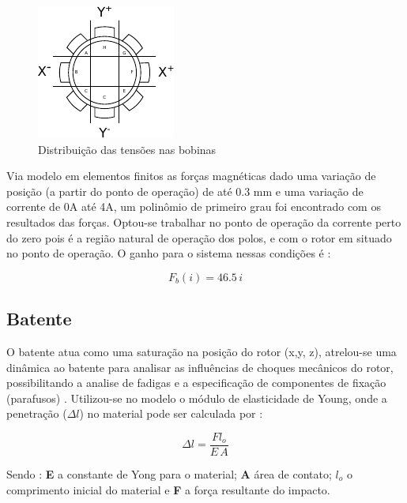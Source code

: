 \begin{figure}[th]
\centering
\includegraphics[width=0.5\linewidth]{./Figs/Modelagem/ativo-atuadores-conexao}
%
\caption{Distribuição das tensões nas bobinas}
\label{fig:blocos:tensao:bobinas:x:y}
\end{figure}

Via modelo em elementos finitos as forças magnéticas dado uma variação de posição (a partir do ponto de operação) de até 0.3 mm e uma variação de corrente de 0A até 4A, um polinômio de primeiro grau foi encontrado com os resultados das forças. Optou-se trabalhar no ponto de operação da corrente perto do zero pois é a região natural de operação dos polos, e com o rotor em situado no ponto de operação. O ganho para o sistema nessas condições é : 

\begin{equation}
     F_b(i) = 46.5 \, i
\end{equation}

\subsection{Batente}

O batente atua como uma saturação na posição do rotor (x,y, z), atrelou-se uma dinâmica ao batente para analisar as influências de choques mecânicos do rotor, possibilitando a analise de fadigas e a especificação de componentes de fixação (parafusos) . Utilizou-se no  modelo o módulo de elasticidade de Young, onde a penetração ($\Delta l $) no material pode ser calculada por :

\begin{equation}
	\Delta l =  \frac{F l_o}{E \, A}
\end{equation}

Sendo : \textbf{E }a constante de Yong para o material; \textbf{A} área de contato; \textbf{$l_o$ } o comprimento inicial do material e \textbf{F} a força resultante do impacto. 

